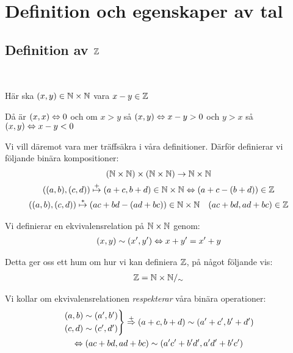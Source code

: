 \section{Definition och egenskaper av tal}\par
\subsection{Definition av $\mathbb{Z}$}\hfill\\\par
\noindent Här ska $(x,y)\in\mathbb{N}\times\mathbb{N}$ vara $x-y\in\mathbb{Z}$\par
\noindent Då är $(x,x)\Leftrightarrow 0$ och om $x>y$ så $(x,y)\Leftrightarrow x-y>0$ och $y>x$ så $(x,y)\Leftrightarrow x-y<0$
\par\bigskip
\noindent Vi vill däremot vara mer träffsäkra i våra definitioner. Därför definierar vi följande binära kompositioner:
\begin{equation*}
  \begin{gathered}
    (\mathbb{N}\times\mathbb{N})\times(\mathbb{N}\times\mathbb{N})\to\mathbb{N}\times\mathbb{N}\\
    ((a,b),(c,d))\stackrel{+}{\mapsto} (a+c,b+d)\in\mathbb{N}\times\mathbb{N}\Leftrightarrow (a+c-(b+d))\in\mathbb{Z}\\
    ((a,b),(c,d))\stackrel{*}{\mapsto} (ac+bd-(ad+bc))\in\mathbb{N}\times\mathbb{N}\quad (ac+bd,ad+bc)\in\mathbb{Z}
  \end{gathered}
\end{equation*}
\par\bigskip
\noindent Vi definierar en ekvivalensrelation på $\mathbb{N}\times\mathbb{N}$ genom:
\begin{equation*}
  \begin{gathered}
    (x,y)\sim (x^{\prime},y^{\prime})\Leftrightarrow x+y^{\prime} = x^{\prime}+y
  \end{gathered}
\end{equation*}
\par\bigskip
\noindent Detta ger oss ett hum om hur vi kan definiera $\mathbb{Z}$, på något följande vis:
\begin{equation*}
  \begin{gathered}
    \mathbb{Z} = \mathbb{N}\times\mathbb{N}/_\sim
  \end{gathered}
\end{equation*}
\par\bigskip
\noindent Vi kollar om ekvivalensrelationen \textit{respekterar} våra binära operationer:
\begin{equation*}
  \begin{gathered}
    \begin{rcases*}
      (a,b)\sim(a^{\prime},b^{\prime})\\
      (c,d)\sim (c^{\prime},d^{\prime})
    \end{rcases*}\stackrel{+}{\Rightarrow} (a+c,b+d)\sim(a^{\prime}+c^{\prime},b^{\prime}+d^{\prime})\\
    \Lrarr (ac+bd,ad+bc)\sim(a^{\prime}c^{\prime}+b^{\prime}d^{\prime}, a^{\prime}d^{\prime}+b^{\prime}c^{\prime})
  \end{gathered}
\end{equation*}
